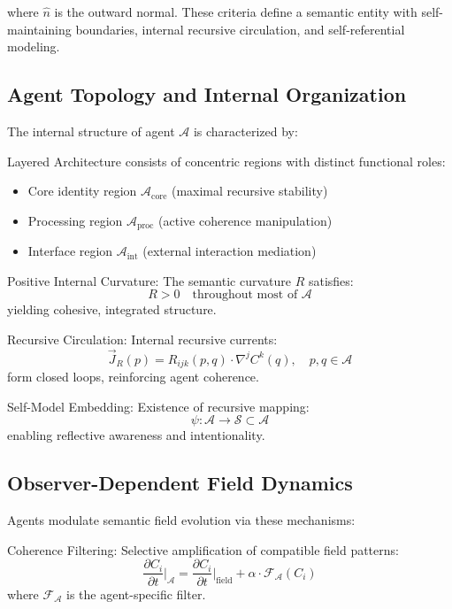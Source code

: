 where \(\hat{n}\) is the outward normal. These criteria define a semantic entity with self-maintaining boundaries, internal recursive circulation, and self-referential modeling.

\subsection{Agent Topology and Internal Organization}

The internal structure of agent \(\mathcal{A}\) is characterized by:

Layered Architecture consists of concentric regions with distinct functional roles:
\begin{itemize}
    \item Core identity region \(\mathcal{A}_{\mathrm{core}}\) (maximal recursive stability)
    \item Processing region \(\mathcal{A}_{\mathrm{proc}}\) (active coherence manipulation)  
    \item Interface region \(\mathcal{A}_{\mathrm{int}}\) (external interaction mediation)
\end{itemize}

Positive Internal Curvature: The semantic curvature \(R\) satisfies:
\begin{equation}
R > 0 \quad \text{throughout most of } \mathcal{A}
\end{equation}
yielding cohesive, integrated structure.

Recursive Circulation: Internal recursive currents:
\begin{equation}
\vec{J}_R(p) = R_{ijk}(p,q) \cdot \nabla^j C^k(q), \quad p,q \in \mathcal{A}
\end{equation}
form closed loops, reinforcing agent coherence.

Self-Model Embedding: Existence of recursive mapping:
\begin{equation}
\psi: \mathcal{A} \to \mathcal{S} \subset \mathcal{A}
\end{equation}
enabling reflective awareness and intentionality.

\subsection{Observer-Dependent Field Dynamics}

Agents modulate semantic field evolution via these mechanisms:

Coherence Filtering: Selective amplification of compatible field patterns:
\begin{equation}
\frac{\partial C_i}{\partial t}\bigg|_{\mathcal{A}} = \frac{\partial C_i}{\partial t}\bigg|_{\mathrm{field}} + \alpha \cdot \mathcal{F}_{\mathcal{A}}(C_i)
\end{equation}
where \(\mathcal{F}_{\mathcal{A}}\) is the agent-specific filter.

